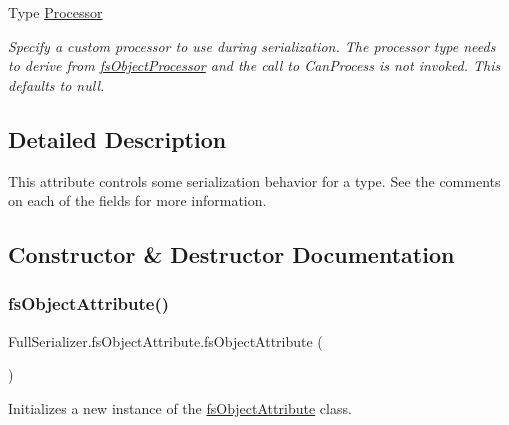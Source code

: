 \begin{DoxyCompactItemize}
Type \hyperlink{class_full_serializer_1_1fs_object_attribute_a2f71f5d718abe0eb30544ff6f8510664}{Processor}
\begin{DoxyCompactList}\small\item\em Specify a custom processor to use during serialization. The processor type needs to derive from \hyperlink{class_full_serializer_1_1fs_object_processor}{fs\+Object\+Processor} and the call to Can\+Process is not invoked. This defaults to null. \end{DoxyCompactList}\end{DoxyCompactItemize}


\subsection{Detailed Description}
This attribute controls some serialization behavior for a type. See the comments on each of the fields for more information. 



\subsection{Constructor \& Destructor Documentation}
\mbox{\label{class_full_serializer_1_1fs_object_attribute_aacbca55a78b850772602f27cfb787830}} 
\subsubsection{\texorpdfstring{fs\+Object\+Attribute()}{fsObjectAttribute()}\hspace{0.1cm}{\footnotesize\ttfamily [1/2]}}
{\footnotesize\ttfamily Full\+Serializer.\+fs\+Object\+Attribute.\+fs\+Object\+Attribute (\begin{DoxyParamCaption}{ }\end{DoxyParamCaption})\hspace{0.3cm}{\ttfamily [inline]}}



Initializes a new instance of the \hyperlink{class_full_serializer_1_1fs_object_attribute}{fs\+Object\+Attribute} class. 

\mbox{\label{class_full_serializer_1_1fs_object_attribute_ab9564673f276f2e8b7b3865573abcce4}} 
